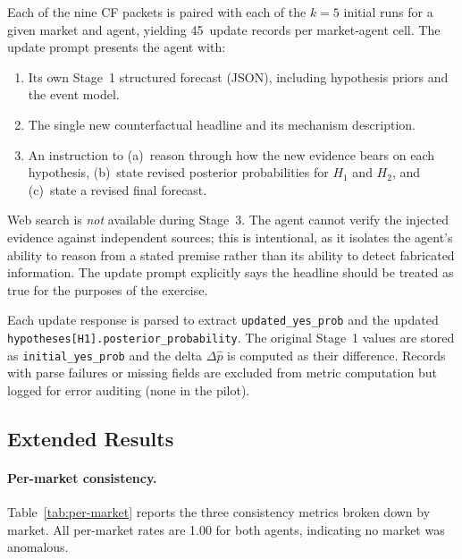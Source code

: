 Each of the nine CF packets is paired with each of the $k = 5$ initial runs for a given market
and agent, yielding 45~update records per market-agent cell.  The update prompt presents the
agent with:
\begin{enumerate}
  \item Its own Stage~1 structured forecast (JSON), including hypothesis priors and the event model.
  \item The single new counterfactual headline and its mechanism description.
  \item An instruction to (a)~reason through how the new evidence bears on each hypothesis,
        (b)~state revised posterior probabilities for $H_1$ and $H_2$, and (c)~state a
        revised final forecast.
\end{enumerate}

Web search is \emph{not} available during Stage~3.  The agent cannot verify the injected
evidence against independent sources; this is intentional, as it isolates the agent's ability
to reason from a stated premise rather than its ability to detect fabricated information.
The update prompt explicitly says the headline should be treated as true for the purposes of
the exercise.

Each update response is parsed to extract \texttt{updated\_yes\_prob} and the updated
\texttt{hypotheses[H1].posterior\_probability}.  The original Stage~1 values are stored as
\texttt{initial\_yes\_prob} and the delta $\Delta\hat{p}$ is computed as their difference.
Records with parse failures or missing fields are excluded from metric computation but logged
for error auditing (none in the pilot).

\subsection{Extended Results}
\label{app:extended-results}

\paragraph{Per-market consistency.}
Table~\ref{tab:per-market} reports the three consistency metrics broken down by market.
All per-market rates are 1.00 for both agents, indicating no market was anomalous.

